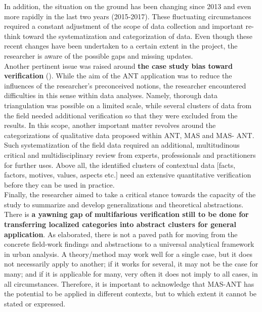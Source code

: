 \documentclass[11pt]{report}
\begin{document}
{{{In addition, the situation on the ground has been changing since 2013 and even more rapidly in the last two years  (2015-2017).
These fluctuating circumstances required a constant adjustment of the scope of data collection and important re-think toward the systematization and categorization of data.
Even though these recent changes have been undertaken to a certain extent in the project, the researcher is aware of the possible gaps and missing updates.
\\

Another pertinent issue was raised around \textbf{the case study bias toward verification} (\href{ref}{\citealt{flyvbjerg_five_2006}}).
While the aim of the ANT application was to reduce the influences of the researcher’s preconceived notions, the researcher encountered difficulties in this sense within data analyses. Namely, thorough data triangulation was possible on a limited scale, while several clusters of data from the field needed additional verification so that they were excluded from the results. In this scope, another important matter revolves around the categorizations of qualitative data proposed within ANT, MAS and MAS- ANT. Such systematization of the field data required an additional, multitudinous critical and multidisciplinary review from experts, professionals and practitioners for further uses. Above all, the identified clusters of contextual data [facts, factors, motives, values, aspects etc.] need an extensive quantitative verification before they can be used in practice.
\\

Finally, the researcher aimed to take a critical stance towards the capacity of the study to summarize and develop generalizations and theoretical abstractions.
There is \textbf{a yawning gap of multifarious verification still to be done for transferring localized categories into abstract clusters for general application}.
As \href{Robinson}{\citealt{robinson_urban_2013}} elaborated, there is not a paved path for moving from the concrete field-work findings and abstractions to a universal analytical framework in urban analysis. A theory/method may work well for a single case, but it does not necessarily apply to another; if it works for several, it may not be the case for many; and if it is applicable for many, very often it does not imply to all cases, in all circumstances. Therefore, it is important to acknowledge that MAS-ANT has the potential to be applied in different contexts, but to which extent it cannot be stated or expressed.

}}}
\end{document}
